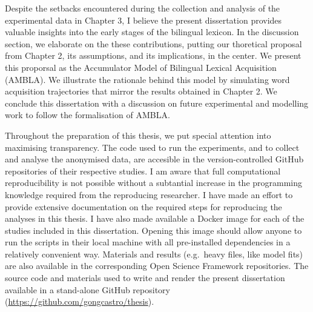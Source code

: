 \documentclass[
  12pt,
  b5paperpaper,
  twoside]{scrreprt}
\renewcommand*\contentsname{Table of contents}
\newcommand\contentsname{Table of contents}
\begin{document}
\begin{spacing}{1.5}
{Despite the setbacks encountered during the collection and analysis of
the experimental data in Chapter 3, I believe the present dissertation
provides valuable insights into the early stages of the bilingual
lexicon. In the discussion section, we elaborate on the these
contributions, putting our thoretical proposal from Chapter 2, its
assumptions, and its implications, in the center. We present this
proporsal as the Accumulator Model of Bilingual Lexical Acquisition
(AMBLA). We illustrate the rationale behind this model by simulating
word acquisition trajectories that mirror the results obtained in
Chapter 2. We conclude this dissertation with a discussion on future
experimental and modelling work to follow the formalisation of AMBLA.

Throughout the preparation of this thesis, we put special attention into
maximising transparency. The code used to run the experiments, and to
collect and analyse the anonymised data, are accesible in the
version-controlled GitHub repositories of their respective studies. I am
aware that full computational reproducibility is not possible without a
subtantial increase in the programming knowledge required from the
reproducing researcher. I have made an effort to provide extensive
documentation on the required steps for reproducing the analyses in this
thesis. I have also made available a Docker image for each of the
studies included in this dissertation. Opening this image should allow
anyone to run the scripts in their local machine with all pre-installed
dependencies in a relatively convenient way. Materials and results
(e.g.~heavy files, like model fits) are also available in the
corresponding Open Science Framework repositories. The source code and
materials used to write and render the present dissertation available in
a stand-alone GitHub repository
(\url{https://github.com/gongcastro/thesis}).}
\clearpage

\end{spacing}\ifdefined\Shaded\renewenvironment{Shaded}{\begin{tcolorbox}[colback={codebgcolor}, borderline west={3pt}{0pt}{shadecolor}, breakable, frame hidden, sharp corners, boxrule=0pt, enhanced]}{\end{tcolorbox}}\fi

\renewcommand*\contentsname{Table of contents}
{
\hypersetup{linkcolor=}
\setcounter{tocdepth}{2}
\tableofcontents
}

\hypertarget{section}{%
\chapter*{}\label{section}}
\end{document}
